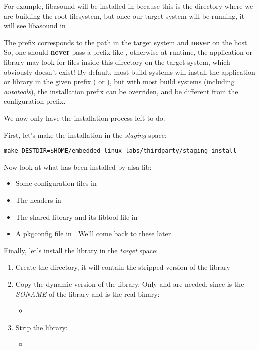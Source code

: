 For example, libasound will be installed in
 because this is
the directory where we are building the root filesystem, but once our
target system will be running, it will see libasound in
.

The prefix corresponds to the path in the target system and {\bf
  never} on the host. So, one should {\bf never} pass a prefix like
, otherwise at
runtime, the application or library may look for files inside this
directory on the target system, which obviously doesn't exist! By
default, most build systems will install the application or library in
the given prefix ( or ), but with most
build systems (including {\em autotools}), the installation prefix can
be overriden, and be different from the configuration prefix.

We now only have the installation process left to do.

First, let's make the installation in the {\em staging} space:
\begin{verbatim}
make DESTDIR=$HOME/embedded-linux-labs/thirdparty/staging install
\end{verbatim}

Now look at what has been installed by alsa-lib:
\begin{itemize}
\item Some configuration files in 
\item The headers in 
\item The shared library and its libtool file in 
\item A pkgconfig file in . We'll come back
  to these later
\end{itemize}

Finally, let's install the library in the {\em target} space:

\begin{enumerate}
\item Create the  directory, it will contain the
  stripped version of the library
\item Copy the dynamic version of the library. Only
   and  are needed,
  since  is the {\em SONAME} of the library and
   is the real binary:
  \begin{itemize}
  \item {}
  \end{itemize}
\item Strip the library:
  \begin{itemize}
  \item {}
  \end{itemize}
\end{enumerate}

